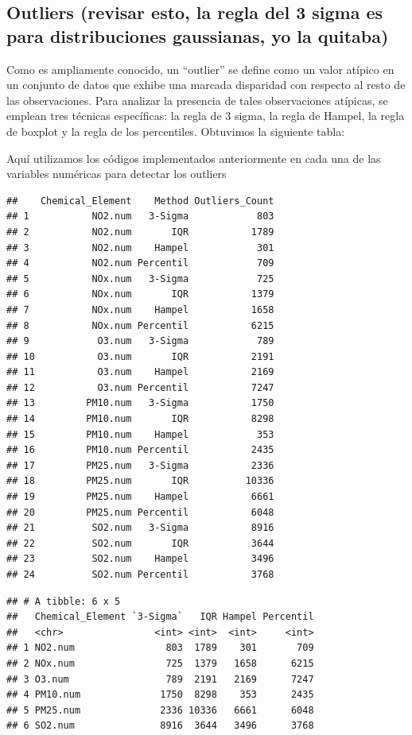 \documentclass[notspecified,article,submit,moreauthors,pdftex]{Definitions/mdpi}
\begin{document}
\hypertarget{outliers-revisar-esto-la-regla-del-3-sigma-es-para-distribuciones-gaussianas-yo-la-quitaba}{%
\subsection{Outliers (revisar esto, la regla del 3 sigma es para
distribuciones gaussianas, yo la
quitaba)}\label{outliers-revisar-esto-la-regla-del-3-sigma-es-para-distribuciones-gaussianas-yo-la-quitaba}}

Como es ampliamente conocido, un ``outlier'' se define como un valor
atípico en un conjunto de datos que exhibe una marcada disparidad con
respecto al resto de las observaciones. Para analizar la presencia de
tales observaciones atípicas, se emplean tres técnicas específicas: la
regla de 3 sigma, la regla de Hampel, la regla de boxplot y la regla de
los percentiles. Obtuvimos la siguiente tabla:

Aquí utilizamos los códigos implementados anteriormente en cada una de
las variables numéricas para detectar los outliers

\begin{verbatim}
##    Chemical_Element    Method Outliers_Count
## 1           NO2.num   3-Sigma            803
## 2           NO2.num       IQR           1789
## 3           NO2.num    Hampel            301
## 4           NO2.num Percentil            709
## 5           NOx.num   3-Sigma            725
## 6           NOx.num       IQR           1379
## 7           NOx.num    Hampel           1658
## 8           NOx.num Percentil           6215
## 9            O3.num   3-Sigma            789
## 10           O3.num       IQR           2191
## 11           O3.num    Hampel           2169
## 12           O3.num Percentil           7247
## 13         PM10.num   3-Sigma           1750
## 14         PM10.num       IQR           8298
## 15         PM10.num    Hampel            353
## 16         PM10.num Percentil           2435
## 17         PM25.num   3-Sigma           2336
## 18         PM25.num       IQR          10336
## 19         PM25.num    Hampel           6661
## 20         PM25.num Percentil           6048
## 21          SO2.num   3-Sigma           8916
## 22          SO2.num       IQR           3644
## 23          SO2.num    Hampel           3496
## 24          SO2.num Percentil           3768
\end{verbatim}

\begin{verbatim}
## # A tibble: 6 x 5
##   Chemical_Element `3-Sigma`   IQR Hampel Percentil
##   <chr>                <int> <int>  <int>     <int>
## 1 NO2.num                803  1789    301       709
## 2 NOx.num                725  1379   1658      6215
## 3 O3.num                 789  2191   2169      7247
## 4 PM10.num              1750  8298    353      2435
## 5 PM25.num              2336 10336   6661      6048
## 6 SO2.num               8916  3644   3496      3768
\end{verbatim}
\end{document}
